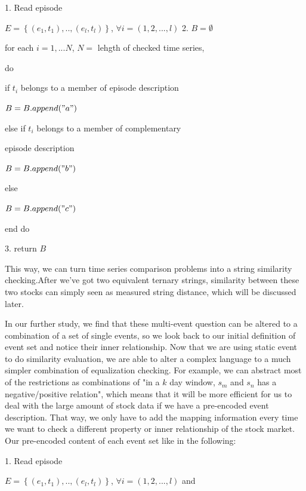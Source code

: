 \documentclass[10pt, conference, compsocconf]{IEEEtran}
\begin{document}
\vspace{0.6mm}
1. Read episode 
\par\quad $E=\left \{ (e_{1},t_{1}),..,(e_{l},t_{l}) \right \}$, $\forall i=(1,2,...,l)$
2. $B=\emptyset$
\par\quad for each $i=1,...N$, $N=$ lehgth of checked time series, 
\par\quad do
\par\quad if $t_{i}$ belongs to a member of episode description
\par\quad $B=B.append("a")$
\par\quad else if $t_{i}$ belongs to a member of complementary 
\par\quad episode description
\par\quad $B=B.append("b")$
\par\quad else
\par\quad $B=B.append("c")$
\par\quad end do
\par
3. return $B$
\vspace{0.6mm}
\par
This way, we can turn time series comparison problems into a string similarity checking.After we've got two equivalent ternary strings, similarity between these two stocks can simply seen as measured string distance, which will be discussed later. \\
\par
In our further study, we find that these multi-event question can be altered to a combination of a set of single events, so we look back to our initial definition of event set and notice their inner relationship. Now that we are using static event to do similarity evaluation, we are able to alter a complex language to a much simpler combination of equalization checking. For example, we can abstract most of the restrictions as combinations of "in a $k$ day window, $s_{m}$ and $s_{n}$ has a negative/positive relation", which means that it will be more efficient for us to deal with the large amount of stock data if we have a pre-encoded event description. That way, we only have to add the mapping information every time we want to check a different property or inner relationship of the stock market. Our pre-encoded content of each event set like in the following:\\
\vspace{1.2mm}
\par
1. Read episode 
\par\quad $E=\left \{ (e_{1},t_{1}),..,(e_{l},t_{l}) \right \}$, $\forall i=(1,2,...,l)$ and
\end{document}

